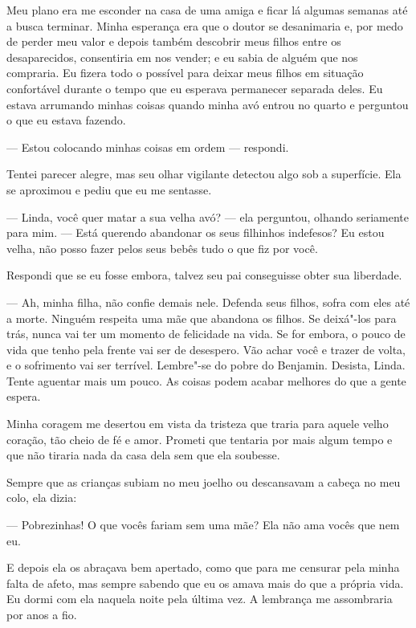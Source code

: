 Meu plano era me esconder na casa de
uma amiga e ficar lá algumas semanas até a busca terminar. Minha
esperança era que o doutor se desanimaria e, por medo de perder meu
valor e depois também descobrir meus filhos entre os desaparecidos,
consentiria em nos vender; e eu sabia de alguém que nos compraria. Eu
fizera todo o possível para deixar meus filhos em situação confortável
durante o tempo que eu esperava permanecer separada deles. Eu estava
arrumando minhas coisas quando minha avó entrou no quarto e perguntou o
que eu estava fazendo.

--- Estou colocando minhas coisas em ordem --- respondi.

Tentei parecer alegre, mas seu olhar vigilante detectou algo sob a
superfície. Ela se aproximou e pediu que eu me sentasse.

--- Linda, você quer matar a sua velha avó? --- ela perguntou, olhando
seriamente para mim. --- Está querendo abandonar os seus filhinhos
indefesos? Eu estou velha, não posso fazer pelos seus bebês tudo o que
fiz por você.

Respondi que se eu fosse embora, talvez
seu pai conseguisse obter sua liberdade.

--- Ah, minha filha, não confie demais
nele. Defenda seus filhos, sofra com eles até a morte. Ninguém respeita
uma mãe que abandona os filhos. Se deixá"-los para trás, nunca vai ter um
momento de felicidade na vida. Se for embora, o pouco de vida que tenho
pela frente vai ser de desespero. Vão achar você e trazer de volta, e o
sofrimento vai ser terrível. Lembre"-se do pobre do Benjamin. Desista,
Linda. Tente aguentar mais um pouco. As coisas podem acabar melhores do
que a gente espera.

Minha coragem me desertou em vista da
tristeza que traria para aquele velho coração, tão cheio de fé e amor.
Prometi que tentaria por mais algum tempo e que não tiraria nada da casa
dela sem que ela soubesse.

Sempre que as crianças subiam no meu
joelho ou descansavam a cabeça no meu colo, ela dizia:

--- Pobrezinhas! O que vocês fariam sem uma mãe? Ela não ama vocês que
nem eu.

E depois ela os abraçava bem apertado, como que para me censurar pela
minha falta de afeto, mas sempre sabendo que eu os amava mais do que a
própria vida. Eu dormi com ela naquela noite pela última vez. A
lembrança me assombraria por anos a fio.

